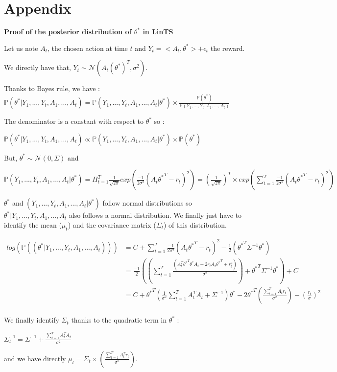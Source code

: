 \section{Appendix}

\textbf{Proof of the posterior distribution of $\theta^*$ in LinTS}


Let us note  $A_t$, the chosen action at time $t$ and $Y_t = < A_t, \theta^*> + \epsilon_t$ the reward. 

We directly have that, $Y_t \sim \mathcal{N}(A_t (\theta^*) ^T, \sigma^2)$. 

Thanks to Bayes rule, we have : \\

$\mathbb{P}(\theta^* | Y_1, ... , Y_t , A_1, ..., A_t) = \mathbb{P}( Y_1, ... , Y_t , A_1, ..., A_t | \theta^* ) \times \frac{\mathbb{P}(\theta^*)}{\mathbb{P}(Y_1, ... , Y_t , A_1, ..., A_t) } $

The denominator is a constant with respect to $\theta^*$ so :

$\mathbb{P}(\theta^* | Y_1, ... , Y_t , A_1, ..., A_t) \propto \mathbb{P}( Y_1, ... , Y_t , A_1, ..., A_t | \theta^* ) \times {\mathbb{P}(\theta^*)}$ 

But, $\theta^* \sim \mathcal{N}(0, \Sigma)$ and

$\mathbb{P}( Y_1, ... , Y_t , A_1, ..., A_t | \theta^* ) = \Pi_{t=1}^{T} \frac{1}{\sqrt{2  \pi}} exp(\frac{-1}{2 \sigma^2} (A_t {\theta^*}^T -r_t)^2) = (\frac{1}{\sqrt{2  \pi}})^T \times exp(\sum_{t=1}^T\frac{-1}{2 \sigma^2} (A_t {\theta^*}^T -r_t)^2) $


$\theta^*$ and $(Y_1, ... , Y_t , A_1, ..., A_t | \theta^*)$ follow normal distributions so  $\theta^* | Y_1, ... , Y_t , A_1, ..., A_t$ also follows a normal distribution.  
We finally just have to identify the mean ($\mu_t$) and the covariance matrix ($\Sigma_t$) of this distribution. 

\begin{align}
    log (\mathbb{P}((  \theta^* |Y_1, ... , Y_t , A_1, ..., A_t ))) &= C + \sum_{t=1}^T\frac{-1}{2 \sigma^2} (A_t {\theta^*}^T -r_t)^2 -\frac{1}{2}({\theta^*}^T \Sigma ^{-1} \theta^*)\\
    & =\frac{-1}{2} ( (\sum_{t=1}^T \frac{(A_t^T {\theta^*}^T \theta^* A_t - 2 r_t A_t{\theta^*}^T + r_t^2)}{\sigma^2}) + {\theta^*}^T \Sigma ^{-1} \theta^*) +C\\
    & = C + {\theta^* }^T(\frac{1}{\sigma^2}\sum_{t=1}^{T} A_t^T A_t + \Sigma^{-1}) \theta^* - 2 {\theta^* }^T(\frac{\sum_{t=1}^T A_t r_t} {\sigma^2}) -(\frac{r_t}{\sigma})^2\\
\end{align}

We finally identify $\Sigma_t$ thanks to the quadratic term in $\theta^*$ :


$\Sigma_t ^{-1} = \Sigma^{-1} + \frac{\sum_{t=1}^{T} A_t^T A_t}{\sigma^2}$ 

and we have directly $\mu_t = \Sigma_t \times (\frac{\sum_{t=1}^{T} A_t^T r_t}{\sigma^2})$. 



